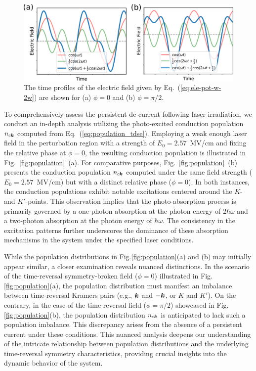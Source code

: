 \begin{figure}[htbp]
 \includegraphics[width=1.0\linewidth]{pic/electric.pdf}
\caption{\label{fig:electricfield} 
The time profiles of the electric field given by Eq.~(\ref{eq:ele-pot-w-2w}) are shown for (a) $\phi=0$ and (b) $\phi=\pi/2$.}
\end{figure}


To comprehensively assess the persistent dc-current following laser irradiation, we conduct an in-depth analysis utilizing the photo-excited conduction population $n_{c\boldsymbol{k}}$ computed from Eq.~(\ref{eq:population_tdse}). Employing a weak enough laser field in the perturbation region with a strength of $E_0=2.57$~MV/cm and fixing the relative phase at $\phi=0$, the resulting conduction population is illustrated in Fig.~\ref{fig:population}~(a). For comparative purposes, Fig.~\ref{fig:population}~(b) presents the conduction population $n_{c\boldsymbol{k}}$ computed under the same field strength ($E_0=2.57$~MV/cm) but with a distinct relative phase ($\phi=0$). In both instances, the conduction populations exhibit notable excitations centered around the $K$- and $K'$-points. This observation implies that the photo-absorption process is primarily governed by a one-photon absorption at the photon energy of $2\hbar \omega$ and a two-photon absorption at the photon energy of $\hbar \omega$. The consistency in the excitation patterns further underscores the dominance of these absorption mechanisms in the system under the specified laser conditions.


While the population distributions in Fig.\ref{fig:population}(a) and (b) may initially appear similar, a closer examination reveals nuanced distinctions. In the scenario of the time-reversal symmetry-broken field ($\phi=0$) illustrated in Fig.\ref{fig:population}(a), the population distribution must manifest an imbalance between time-reversal Kramers pairs (e.g., $\boldsymbol{k}$ and $-\boldsymbol{k}$, or $K$ and $K'$). On the contrary, in the case of the time-reversal field ($\phi=\pi/2$) showcased in Fig.\ref{fig:population}(b), the population distribution $n_{c\boldsymbol{k}}$ is anticipated to lack such a population imbalance. This discrepancy arises from the absence of a persistent current under these conditions. This nuanced analysis deepens our understanding of the intricate relationship between population distributions and the underlying time-reversal symmetry characteristics, providing crucial insights into the dynamic behavior of the system.

